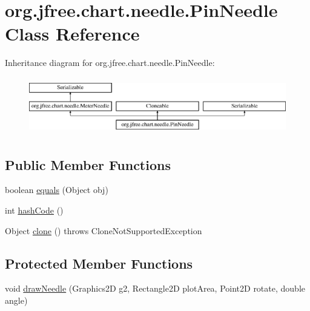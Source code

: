 \hypertarget{classorg_1_1jfree_1_1chart_1_1needle_1_1_pin_needle}{}\section{org.\+jfree.\+chart.\+needle.\+Pin\+Needle Class Reference}
\label{classorg_1_1jfree_1_1chart_1_1needle_1_1_pin_needle}
Inheritance diagram for org.\+jfree.\+chart.\+needle.\+Pin\+Needle\+:\begin{figure}[H]
\begin{center}
\leavevmode
\includegraphics[height=2.533937cm]{classorg_1_1jfree_1_1chart_1_1needle_1_1_pin_needle}
\end{center}
\end{figure}
\subsection*{Public Member Functions}
\begin{DoxyCompactItemize}
\item 
boolean \mbox{\hyperlink{classorg_1_1jfree_1_1chart_1_1needle_1_1_pin_needle_a36ff6ecb49f077d433f62ee2a981c22a}{equals}} (Object obj)
\item 
int \mbox{\hyperlink{classorg_1_1jfree_1_1chart_1_1needle_1_1_pin_needle_a26275883321cb01935c11c2820c63e7f}{hash\+Code}} ()
\item 
Object \mbox{\hyperlink{classorg_1_1jfree_1_1chart_1_1needle_1_1_pin_needle_aeccbee91065e41ea04c45d391d15ec35}{clone}} ()  throws Clone\+Not\+Supported\+Exception 
\end{DoxyCompactItemize}
\subsection*{Protected Member Functions}
\begin{DoxyCompactItemize}
\item 
void \mbox{\hyperlink{classorg_1_1jfree_1_1chart_1_1needle_1_1_pin_needle_ab8a0ec301185b84573d54119f8877eb8}{draw\+Needle}} (Graphics2D g2, Rectangle2D plot\+Area, Point2D rotate, double angle)
\end{DoxyCompactItemize}
